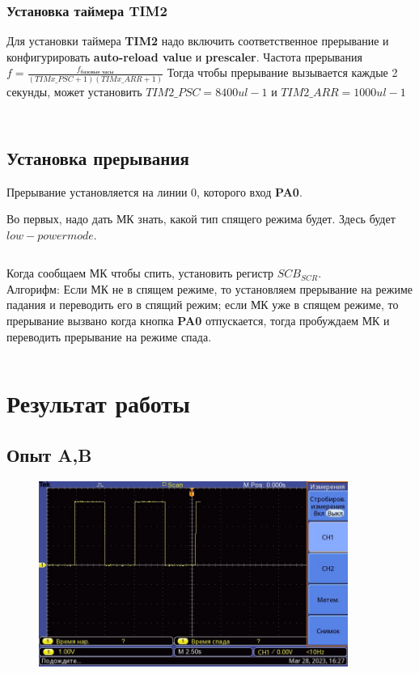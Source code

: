 \documentclass[12pt]{article} %
\begin{document}
\subsubsection*{Установка таймера \textbf{TIM2}}
Для установки таймера \textbf{TIM2} надо включить соответственное прерывание и конфигурировать \textbf{auto-reload value} и \textbf{prescaler}. Частота прерывания $f = \frac{f_\text{базовые часы}}{(TIMx\_PSC+1)(TIMx\_ARR+1)}$
Тогда чтобы прерывание вызывается каждые 2 секунды, может установить $TIM2\_PSC = 8400ul-1$ и $TIM2\_ARR = 1000ul-1$
\inputminted[firstline = 57, lastline = 69, breaklines]{C}{F:/git/micro/Lab4/Lab4.c}
\inputminted[firstline = 122, lastline = 124, breaklines]{C}{F:/git/micro/Lab4/Lab4.c}

\subsection{Установка прерывания}
Прерывание установляется на линии 0, которого вход \textbf{PA0}.

Во первых, надо дать МК знать, какой тип спящего режима будет. Здесь будет $low - power mode$.
\inputminted[firstline = 73, lastline = 76, breaklines]{C}{F:/git/micro/Lab4/Lab4.c}
Когда сообщаем МК чтобы спить, установить регистр $SCB_{SCR}$.\\

Алгорифм: Если МК не в спящем режиме, то установляем прерывание на режиме падания и переводить его в спящий режим; если МК уже в спящем режиме, то прерывание вызвано когда кнопка \textbf{PA0} отпускается, тогда пробуждаем МК и переводить прерывание на режиме спада. 

\inputminted[firstline = 103, lastline = 121, breaklines]{C}{F:/git/micro/Lab4/Lab4.c}



\section{Результат работы}
\subsection{Опыт A,B}
\begin{figure}[H]
\includegraphics[width=0.9\textwidth]{exA.jpg}
\end{figure}
\end{document}
